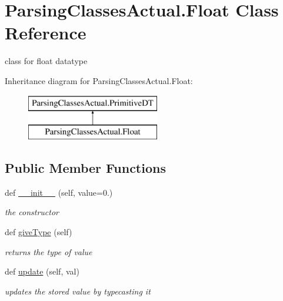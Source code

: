 \hypertarget{class_parsing_classes_actual_1_1_float}{}\section{Parsing\+Classes\+Actual.\+Float Class Reference}
\label{class_parsing_classes_actual_1_1_float}


class for float datatype  


Inheritance diagram for Parsing\+Classes\+Actual.\+Float\+:\begin{figure}[H]
\begin{center}
\leavevmode
\includegraphics[height=2.000000cm]{class_parsing_classes_actual_1_1_float}
\end{center}
\end{figure}
\subsection*{Public Member Functions}
\begin{DoxyCompactItemize}
\item 
def \hyperlink{class_parsing_classes_actual_1_1_float_a285387447fcf577d0ef3b1f3f8f4e69b}{\+\_\+\+\_\+init\+\_\+\+\_\+} (self, value=0.)
\begin{DoxyCompactList}\small\item\em the constructor \end{DoxyCompactList}\item 
def \hyperlink{class_parsing_classes_actual_1_1_float_ae424695b61f25088e1378a672da9036c}{give\+Type} (self)\hypertarget{class_parsing_classes_actual_1_1_float_ae424695b61f25088e1378a672da9036c}{}\label{class_parsing_classes_actual_1_1_float_ae424695b61f25088e1378a672da9036c}

\begin{DoxyCompactList}\small\item\em returns the type of value \end{DoxyCompactList}\item 
def \hyperlink{class_parsing_classes_actual_1_1_float_a87739feda988d226bb1e384b31cbc113}{update} (self, val)\hypertarget{class_parsing_classes_actual_1_1_float_a87739feda988d226bb1e384b31cbc113}{}\label{class_parsing_classes_actual_1_1_float_a87739feda988d226bb1e384b31cbc113}

\begin{DoxyCompactList}\small\item\em updates the stored value by typecasting it \end{DoxyCompactList}\end{DoxyCompactItemize}

